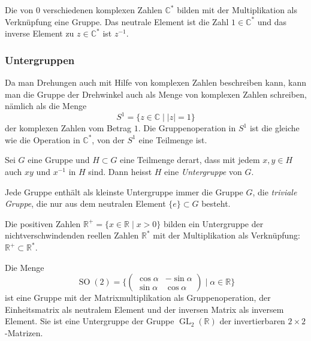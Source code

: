 \begin{beispiel}
Die von $0$ verschiedenen komplexen Zahlen $\mathbb{C}^*$ bilden mit
der Multiplikation als Verknüpfung eine Gruppe.
Das neutrale Element ist die Zahl $1\in\mathbb{C}^*$ und das inverse
Element zu $z\in\mathbb{C}^*$ ist $z^{-1}$.
\end{beispiel}

%
%
\subsubsection{Untergruppen}
Da man Drehungen auch mit Hilfe von komplexen Zahlen beschreiben kann,
kann man die Gruppe der Drehwinkel auch als Menge von komplexen Zahlen
schreiben, nämlich als die Menge
\[
S^1
=
\{z\in\mathbb{C}\mid |z|=1\}
\]
der komplexen Zahlen vom Betrag $1$.
Die Gruppenoperation in $S^1$ ist die gleiche wie die Operation
in $\mathbb{C}^*$, von der $S^1$ eine Teilmenge ist.

\begin{definition}
\label{buch:gruppen:definition:def:untergruppe}
Sei $G$ eine Gruppe und $H\subset G$ eine Teilmenge derart,
dass mit jedem $x,y\in H$ auch $xy$ und $x^{-1}$ in $H$ sind.
Dann heisst $H$ eine {\em Untergruppe} von $G$.
%
\end{definition}

Jede Gruppe enthält als kleinste Untergruppe immer die Gruppe $G$,
die {\em triviale Gruppe}, die nur aus dem neutralen Element
$\{e\}\subset G$ besteht.

\begin{beispiel}
Die positiven Zahlen $\mathbb{R}^+ = \{x\in \mathbb{R}\mid x>0\}$ 
bilden ein Untergruppe der nichtverschwindenden reellen Zahlen
$\mathbb{R}^*$ mit der Multiplikation als Verknüpfung:
$\mathbb{R}^+\subset\mathbb{R}^*$.
\end{beispiel}

\begin{beispiel}
\label{buch:gruppen:definition:bsp:so2}
Die Menge
\[
\operatorname{SO}(2)
=
\biggl\{
\begin{pmatrix}
\cos\alpha & -\sin\alpha \\
\sin\alpha &  \cos\alpha
\end{pmatrix}
\;
\bigg|
\;
\alpha\in\mathbb{R}
\biggr\}
\]
ist eine Gruppe mit der Matrixmultiplikation als Gruppenoperation,
der Einheitsmatrix als neutralem Element und der inversen Matrix
als inversem Element.
Sie ist eine Untergruppe der Gruppe $\operatorname{GL}_2(\mathbb{R})$
der invertierbaren $2\times 2$-Matrizen.
\end{beispiel}

